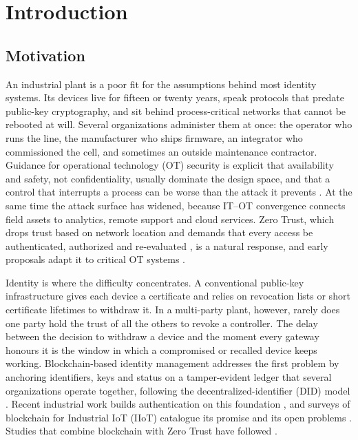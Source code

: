 \section{Introduction}\label{sec:intro}

\subsection{Motivation}
An industrial plant is a poor fit for the assumptions behind most identity systems. Its devices live for fifteen or twenty years, speak protocols that predate public-key cryptography, and sit behind process-critical networks that cannot be rebooted at will. Several organizations administer them at once: the operator who runs the line, the manufacturer who ships firmware, an integrator who commissioned the cell, and sometimes an outside maintenance contractor. Guidance for operational technology (OT) security is explicit that availability and safety, not confidentiality, usually dominate the design space, and that a control that interrupts a process can be worse than the attack it prevents \cite{stouffer2023sp80082}. At the same time the attack surface has widened, because IT--OT convergence connects field assets to analytics, remote support and cloud services. Zero Trust, which drops trust based on network location and demands that every access be authenticated, authorized and re-evaluated \cite{nist800207,fernandez2024critical,phiayura2023comprehensive}, is a natural response, and early proposals adapt it to critical OT systems \cite{song2025ztot,zanasi2024flexible}.

Identity is where the difficulty concentrates. A conventional public-key infrastructure gives each device a certificate and relies on revocation lists or short certificate lifetimes to withdraw it. In a multi-party plant, however, rarely does one party hold the trust of all the others to revoke a controller. The delay between the decision to withdraw a device and the moment every gateway honours it is the window in which a compromised or recalled device keeps working. Blockchain-based identity management addresses the first problem by anchoring identifiers, keys and status on a tamper-evident ledger that several organizations operate together, following the decentralized-identifier (DID) model \cite{w3cdid2022,hosseini2023blockchain,aguru2025ssi,folino2025puf}. Recent industrial work builds authentication on this foundation \cite{zhai2025chebyshev}, and surveys of blockchain for Industrial IoT (IIoT) catalogue its promise and its open problems \cite{essaid2025iiotbc}. Studies that combine blockchain with Zero Trust have followed \cite{liu2024dissecting,nie2025zeroTrust,salim2026ztblociot,mukta2026ztdelegation,jamwal2026survey,farhan2026ztfsf,potturi2026hybrid}.

